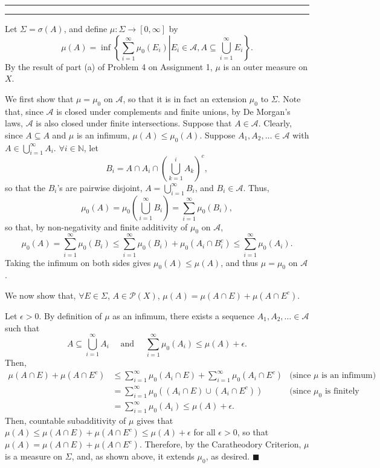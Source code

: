 \documentclass[11pt]{article}
\newcounter{questionCounter}
\newcounter{partCounter}[questionCounter]
\newenvironment{question}[2][\arabic{questionCounter}]{%
    \setcounter{partCounter}{0}%
    \vspace{.25in} \hrule \vspace{0.5em}%
        \noindent{\bf #2}%
    \vspace{0.8em} \hrule \vspace{.10in}%
    \addtocounter{questionCounter}{1}%
}{}
\renewcommand{\qed}{\quad $\blacksquare$}
\newcommand{\N}{\mathbb{N}} %
\newcommand{\pow}[1]{\mathcal{P}\left(#1\right)} %
\begin{document}
\begin{question}{Problem 6} Let $\Sigma = \sigma(A)$, and define
$\mu: \Sigma \rightarrow [0,\infty]$ by
\[\mu(A)
 = \inf \left\{\sum_{i = 1}^{\infty} \mu_0(E_i) \right.
    \left|
        E_i \in \mathcal{A}, A \subseteq \bigcup_{i = 1}^{\infty} E_i
    \right\}
.\]
By the result of part (a) of Problem 4 on Assignment 1, $\mu$ is an outer
measure on $X$.

We first show that $\mu = \mu_0$ on $\mathcal{A}$, so that it is in fact an
extension $\mu_0$ to $\Sigma$. Note that, since $\mathcal{A}$ is closed under
complements and finite unions, by De Morgan's laws, $\mathcal{A}$ is also
closed under finite intersections. Suppose that $A \in \mathcal{A}$. Clearly,
since $A \subseteq A$ and $\mu$ is an infimum, $\mu(A) \leq \mu_0(A)$. Suppose
$A_1,A_2,\ldots \in \mathcal{A}$ with $A \in \bigcup_{i = 1}^{\infty} A_i$.
$\forall i \in \N$, let
\[B_i = A \cap A_i \cap \left( \bigcup_{k = 1}^i A_k \right)^c,\] so that the
$B_i$'s are pairwise disjoint, $A = \bigcup_{i = 1}^{\infty} B_i$, and
$B_i \in \mathcal{A}$. Thus,
\[\mu_0(A) = \mu_0\left( \bigcup_{i = 1}^{\infty} B_i \right)
 = \sum_{i = 1}^{\infty} \mu_0(B_i),\]
so that, by non-negativity and finite additivity of $\mu_0$ on $\mathcal{A}$,
\[\mu_0(A)
 = \sum_{i = 1}^{\infty} \mu_0(B_i)
 \leq \sum_{i = 1}^{\infty} \mu_0(B_i) + \mu_0(A_i \cap B_i^c)
 \leq \sum_{i = 1}^{\infty} \mu_0(A_i).
\]
Taking the infimum on both sides gives $\mu_0(A) \leq \mu(A)$, and
thus $\mu = \mu_0$ on $\mathcal{A}$.

We now show that, $\forall E \in \Sigma$, $A \in \pow{X}$,
$\mu(A) = \mu(A \cap E) + \mu(A \cap E^c)$.

Let $\epsilon > 0$. By definition of $\mu$ as an infimum, there exists a
sequence $A_1,A_2,\ldots \in \mathcal{A}$ such that
\[A \subseteq \bigcup_{i = 1}^{\infty} A_i
 \quad \mbox{ and } \quad
\sum_{i = 1}^{\infty} \mu_0(A_i)
 \leq \mu(A) + \epsilon.
\]
Then,
\begin{align*}
\mu(A \cap E) + \mu(A \cap E^c)
 & \leq \sum_{i = 1}^{\infty} \mu_0(A_i \cap E)
   +    \sum_{i = 1}^{\infty} \mu_0(A_i \cap E^c)
                                       & \mbox{(since $\mu$ is an infimum)} \\
 & =    \sum_{i = 1}^{\infty} \mu_0( (A_i \cap E) \cup (A_i \cap E^c) )
                              & \mbox{(since $\mu_0$ is finitely additive)} \\
 & =    \sum_{i = 1}^{\infty} \mu_0(A_i)
   \leq \mu(A) + \epsilon.
\end{align*}
Then, countable subadditivity of $\mu$ gives that
$\mu(A) \leq \mu(A \cap E) + \mu(A \cap E^c) \leq \mu(A) + \epsilon$ for all
$\epsilon > 0$, so that $\mu(A) = \mu(A \cap E) + \mu(A \cap E^c)$.
Therefore, by the Caratheodory Criterion, $\mu$ is a measure on $\Sigma$, and,
as shown above, it extends $\mu_0$, as desired. \qed

\end{question}
\end{document}
